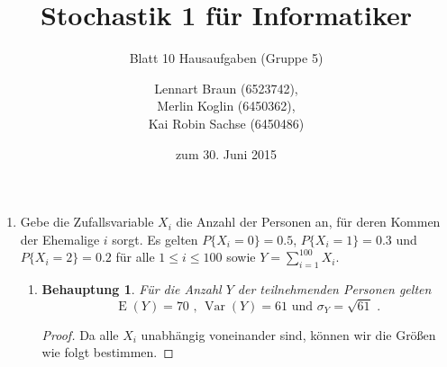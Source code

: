 \documentclass[a4paper]{scrartcl}
\title{Stochastik 1 für Informatiker}
\subtitle{Blatt 10 Hausaufgaben (Gruppe 5)}
\author{
    Lennart Braun (6523742), \\
    Merlin Koglin (6450362), \\
    Kai Robin Sachse (6450486)
}
\date{zum 30. Juni 2015}
\newtheorem*{behaupt}{Behauptung}
\newcommand{\e}{\operatorname{E}}
\newcommand{\var}{\operatorname{Var}}
\begin{document}
\maketitle

\begin{enumerate}[label=\bfseries\arabic*.]
    \item
        Gebe die Zufallsvariable $X_i$ die Anzahl der Personen an, für deren
        Kommen der Ehemalige $i$ sorgt.
        Es gelten $P\{X_i = 0\} = \num{0,5}$, $P\{X_i = 1\} = \num{0,3}$ und
        $P\{X_i = 2\} = \num{0,2}$ für alle $1 \leq i \leq 100$ sowie
        $Y = \sum_{i=1}^{100} X_i$.
        \begin{enumerate}[label=(\alph*)]
            \item
                \begin{behaupt}
                    Für die Anzahl $Y$ der teilnehmenden Personen gelten
                    \begin{equation*}
                        \e(Y) = 70 \text{ , } \var(Y) = 61 \text{ und }
                        \sigma_Y = \sqrt{61} \text{ .}
                    \end{equation*}
                \end{behaupt}
                \begin{proof}
                    Da alle $X_i$ unabhängig voneinander sind, können wir die
                    Größen wie folgt bestimmen.


\end{proof}
\end{enumerate}
\end{enumerate}
\end{document}
